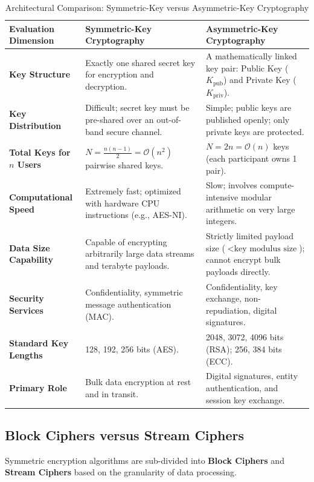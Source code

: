 \begin{table}[htbp]
\centering
\caption{Architectural Comparison: Symmetric-Key versus Asymmetric-Key Cryptography}
\label{tab:sym_vs_asym}
\begin{tabularx}{\textwidth}{p{3.2cm} X X}
\toprule
\textbf{Evaluation Dimension} & \textbf{Symmetric-Key Cryptography} & \textbf{Asymmetric-Key Cryptography} \\
\midrule
\textbf{Key Structure} & Exactly one shared secret key for encryption and decryption. & A mathematically linked key pair: Public Key ($K_{\text{pub}}$) and Private Key ($K_{\text{priv}}$). \\
\textbf{Key Distribution} & Difficult; secret key must be pre-shared over an out-of-band secure channel. & Simple; public keys are published openly; only private keys are protected. \\
\textbf{Total Keys for $n$ Users} & $N = \frac{n(n-1)}{2} = \mathcal{O}(n^2)$ pairwise shared keys. & $N = 2n = \mathcal{O}(n)$ keys (each participant owns 1 pair). \\
\textbf{Computational Speed} & Extremely fast; optimized with hardware CPU instructions (e.g., AES-NI). & Slow; involves compute-intensive modular arithmetic on very large integers. \\
\textbf{Data Size Capability} & Capable of encrypting arbitrarily large data streams and terabyte payloads. & Strictly limited payload size ($< \text{key modulus size}$); cannot encrypt bulk payloads directly. \\
\textbf{Security Services} & Confidentiality, symmetric message authentication (MAC). & Confidentiality, key exchange, non-repudiation, digital signatures. \\
\textbf{Standard Key Lengths} & 128, 192, 256 bits (AES). & 2048, 3072, 4096 bits (RSA); 256, 384 bits (ECC). \\
\textbf{Primary Role} & Bulk data encryption at rest and in transit. & Digital signatures, entity authentication, and session key exchange. \\
\bottomrule
\end{tabularx}
\end{table}

\subsection{Block Ciphers versus Stream Ciphers}

Symmetric encryption algorithms are sub-divided into \textbf{Block Ciphers} and \textbf{Stream Ciphers} based on the granularity of data processing.

